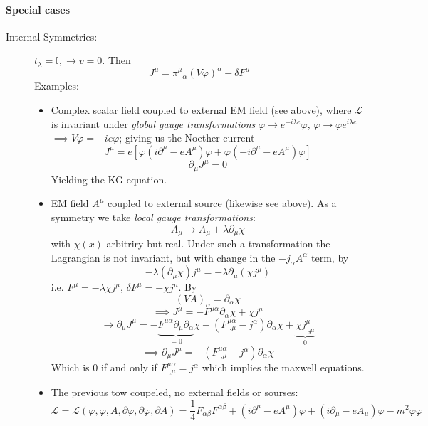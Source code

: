 \documentclass{report}
\begin{document}
\paragraph{Special cases}
\begin{description}
  \item[Internal Symmetries:] $t_\lambda = \mathbb{I}, \to v = 0$. Then \[
  J^{\mu} = \pi^{\mu}_{\text{ }\alpha} \left( V\varphi \right) ^{\alpha} - \delta F^{\mu} 
  \] Examples:
  \begin{itemize}
    \item Complex scalar field coupled to external EM field (see above), where $\mathcal{L} $ is invariant under \emph{global gauge transformations} $\varphi \to e^{-i \lambda e} \varphi$, $\overline{\varphi} \to \overline{\varphi} e^{i\lambda e} $ $\implies V\varphi = -i e \varphi$; giving us the Noether current \[
    J^{\mu} = e \left[ \overline{\varphi}\left( i\partial^{\mu} - eA^{\mu} \right) \varphi  + \varphi\left( -i\partial^{\mu} - eA^{\mu} \right) \overline{\varphi}  \right] 
    \] \[
    \partial_\mu J^{\mu} = 0 
    \] Yielding the KG equation.
  \item EM field $A^{\mu} $ coupled to external source (likewise see above). As a symmetry we take \emph{local gauge transformations}: \[
  A_\mu \to A_\mu + \lambda \partial_\mu \chi
\] with $\chi( x )$  arbitriry but real. Under such a transformation the Lagrangian is not invariant, but with change in the $-j_\alpha A^{\alpha} $ term, by  \[
- \lambda \left( \partial_\mu  \chi \right) j^{\mu}  = -\lambda \partial_\mu \left( \chi j^{\mu} \right) 
\] i.e. $F^{\mu} = -\lambda \chi j^{\mu} $, $\delta F^{\mu} = - \chi j^{\mu} $. By \[
\left( VA \right)_\alpha = \partial_\alpha \chi 
\] \[
\implies J^{\mu} = - F^{\mu \alpha} \partial_\alpha \chi + \chi j^{\mu} 
\] \[
\to \partial_\mu J^{\mu} = - \underbrace{ F^{\mu\alpha} \partial_\mu \partial_\alpha}_{=0}  \chi - \left( F^{\mu \alpha}_{\text{  ,}\mu} - j^{\alpha}  \right) \partial_\alpha \chi + \underbrace{\chi j^{\mu}_{\text{ ,}\mu} }_{0}  
\] \[
\implies \partial_\mu J^{\mu} = - \left( F^{\mu \alpha}_{\text{ ,}\mu} - j^{\alpha}  \right)\partial_\alpha \chi 
\] Which is $0$ if and only if $F^{\mu\alpha}_{\text{ ,}\mu} = j^{\alpha}  $ which implies the maxwell equations.
  \item The previous tow coupeled, no external fields or sourses: \[
  \mathcal{L}  = \mathcal{L} \left( \varphi, \overline{\varphi} , A, \partial \varphi , \partial \overline{\varphi} , \partial A \right) = \frac{1}{4} F_{\alpha \beta}F^{\alpha \beta} + \left( i \partial^{\mu} - e A^{\mu} \right) \overline{\varphi} + \left( i \partial_\mu - e A_\mu \right) \varphi - m^2 \overline{\varphi} \varphi 
\]
\end{itemize}
\end{description}
\end{document}
